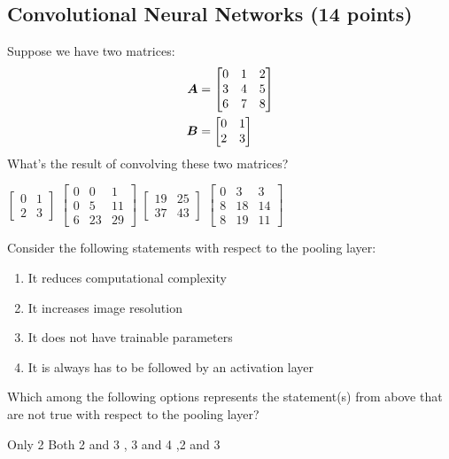 \subsection{Convolutional Neural Networks (14 points)} 
\begin{questions}
    \question[2] Suppose we have two matrices: 
    \begin{align*}
        {\bm{A}} &= \begin{bmatrix}
        0 & 1 & 2\\
        3 & 4 & 5\\
        6 & 7 & 8
        \end{bmatrix}\\
        {\bm{B}} &= \begin{bmatrix}
        0 & 1 \\
        2 & 3
        \end{bmatrix}
    \end{align*}
    What's the result of convolving these two matrices?
    \begin{checkboxes}
        \choice $\begin{bmatrix}
        0 & 1 \\
        2 & 3
        \end{bmatrix}$
        \choice $\begin{bmatrix}
        0 & 0 & 1\\
        0 & 5 & 11\\
        6 & 23 & 29
        \end{bmatrix}$
        \choice $\begin{bmatrix}
        19 & 25\\
        37 & 43
        \end{bmatrix}$
        \choice $\begin{bmatrix}
        0 & 3 & 3\\
        8 & 18 & 14\\
        8 & 19 & 11
        \end{bmatrix}$
    \end{checkboxes}
    
    \clearpage
    \question[3] Consider the following statements with respect to the pooling layer:
    \begin{enumerate}
        \item It reduces computational complexity
        \item It increases image resolution
        \item It does not have trainable parameters
        \item It is always has to be followed by an activation layer
    \end{enumerate}
    Which among the following options represents the statement(s) from above that are not true with respect to the pooling layer?
    \begin{checkboxes}
        \choice Only 2
        \choice Both 2 and 3
        , 3 and 4
        ,2 and 3
    \end{checkboxes}
    

\end{questions}
